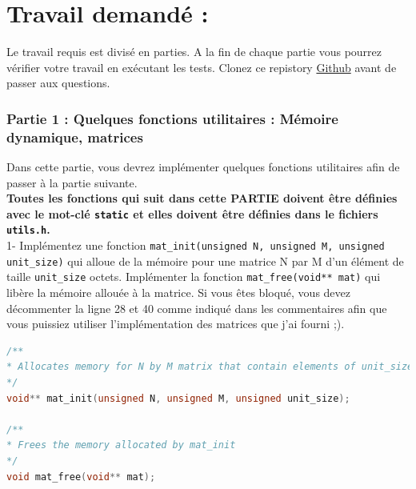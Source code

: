 \documentclass[a4paper]{article}
\begin{document}
	\section*{Travail demandé : }
	Le travail requis est divisé en parties. A la fin de chaque partie vous pourrez vérifier votre travail en exécutant les tests. 
	Clonez ce repistory \href{https://github.com/Darhal/TeachingC/tree/main/assignements/pbs3}{Github} avant de passer aux questions. \\
	
	\subsubsection*{Partie 1 : Quelques fonctions utilitaires : Mémoire dynamique, matrices}
	Dans cette partie, vous devrez implémenter quelques fonctions utilitaires afin de passer à la partie suivante. \\
	\textbf{Toutes les fonctions qui suit dans cette PARTIE doivent être définies avec le mot-clé \texttt{static} et elles doivent être définies dans le fichiers \texttt{utils.h}.} \\
	
	1- Implémentez une fonction \texttt{mat\_init(unsigned N, unsigned M, unsigned unit\_size)} qui alloue de la mémoire pour une matrice N par M d'un élément de taille \texttt{unit\_size} octets. Implémenter la fonction \texttt{mat\_free(void** mat)} qui libère la mémoire allouée à la matrice. Si vous êtes bloqué, vous devez décommenter la ligne 28 et 40 comme indiqué dans les commentaires afin que vous puissiez utiliser l'implémentation des matrices que j'ai fourni ;). \\
	\begin{lstlisting}[language=C]
/**
* Allocates memory for N by M matrix that contain elements of unit_size bytes
*/ 
void** mat_init(unsigned N, unsigned M, unsigned unit_size);

/**
* Frees the memory allocated by mat_init
*/
void mat_free(void** mat);
	\end{lstlisting}
	
\end{document}
